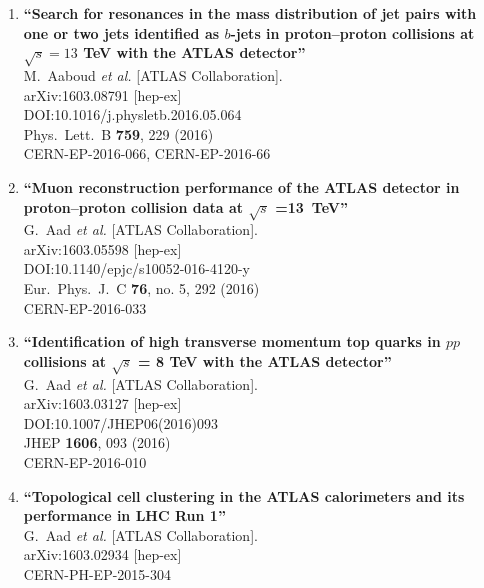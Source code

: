 \documentclass{article}
\begin{document}
\begin{enumerate}
\item%
{\bf ``Search for resonances in the mass distribution of jet pairs with one or two jets identified as $b$-jets in proton--proton collisions at $\sqrt{s}=13$ TeV with the ATLAS detector''}
  \\{}M.~Aaboud {\it et al.} [ATLAS Collaboration].
  \\{}arXiv:1603.08791 [hep-ex]
  \\{}DOI:10.1016/j.physletb.2016.05.064
  \\{}Phys.\ Lett.\ B {\bf 759}, 229 (2016)
  \\{}CERN-EP-2016-066, CERN-EP-2016-66
\item%
{\bf ``Muon reconstruction performance of the ATLAS detector in proton–proton collision data at $\sqrt{s}$ =13 TeV''}
  \\{}G.~Aad {\it et al.} [ATLAS Collaboration].
  \\{}arXiv:1603.05598 [hep-ex]
  \\{}DOI:10.1140/epjc/s10052-016-4120-y
  \\{}Eur.\ Phys.\ J.\ C {\bf 76}, no. 5, 292 (2016)
  \\{}CERN-EP-2016-033
\item%
{\bf ``Identification of high transverse momentum top quarks in $pp$ collisions at $\sqrt{s}$ = 8 TeV with the ATLAS detector''}
  \\{}G.~Aad {\it et al.} [ATLAS Collaboration].
  \\{}arXiv:1603.03127 [hep-ex]
  \\{}DOI:10.1007/JHEP06(2016)093
  \\{}JHEP {\bf 1606}, 093 (2016)
  \\{}CERN-EP-2016-010
\item%
{\bf ``Topological cell clustering in the ATLAS calorimeters and its performance in LHC Run 1''}
  \\{}G.~Aad {\it et al.} [ATLAS Collaboration].
  \\{}arXiv:1603.02934 [hep-ex]
  \\{}CERN-PH-EP-2015-304

\end{enumerate}
\end{document}
